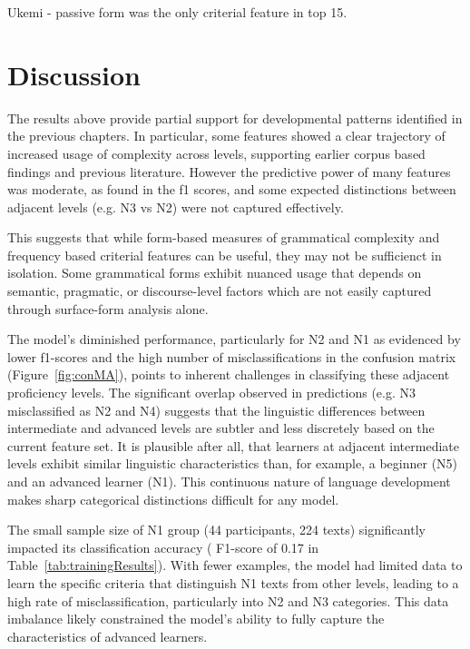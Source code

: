 Ukemi - passive form was the only criterial feature in top 15.


\section{Discussion}

The results above provide partial support for developmental patterns identified in the previous chapters. In
particular, some features showed a clear trajectory of increased usage of complexity across levels, supporting
earlier corpus based findings and previous literature. However the predictive power of many features was moderate,
as found in the f1 scores, and some expected distinctions between adjacent levels (e.g. N3 vs N2) were not captured
effectively.

This suggests that while form-based measures of grammatical complexity and frequency based criterial features can be
useful, they may not be sufficienct in isolation. Some grammatical forms exhibit nuanced usage that depends on
semantic, pragmatic, or discourse-level factors which are not easily captured through surface-form
analysis alone.

The model's diminished performance, particularly for N2 and N1 as evidenced by lower f1-scores and the high number
of misclassifications in the confusion matrix (Figure~\ref{fig:conMA}), points to inherent challenges in
classifying these adjacent proficiency levels. The significant overlap observed in predictions (e.g. N3 misclassified
as N2 and N4) suggests that the linguistic differences between intermediate and advanced levels are subtler and less
discretely based on the current feature set. It is plausible after all, that learners at adjacent intermediate
levels exhibit similar linguistic characteristics than, for example, a beginner (N5) and an advanced learner (N1).
This continuous nature of language development makes sharp categorical distinctions difficult for any model.

The small sample size of N1 group (44 participants, 224 texts) significantly impacted its classification accuracy (
F1-score
of 0.17 in Table~\ref{tab:trainingResults}). With fewer examples, the model had limited data to learn the specific
criteria that distinguish N1 texts from other levels, leading to a high rate of misclassification, particularly into
N2 and N3 categories. This data imbalance likely constrained the model's ability to fully capture the
characteristics of advanced learners.


